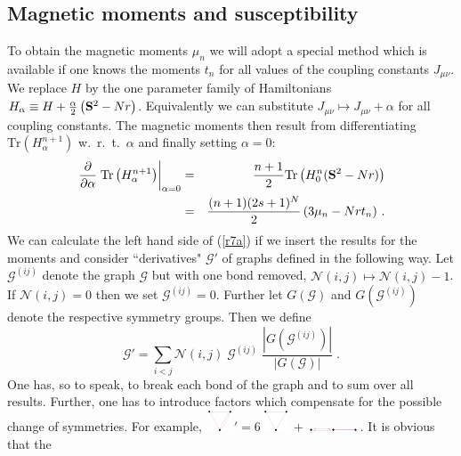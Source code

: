 \documentclass[aps,twocolumn,groupedaddress]{revtex4}
\begin{document}
\subsection{Magnetic moments and susceptibility}\label{sec:R_susc}
To obtain the magnetic moments $\mu_n$ we will adopt a special
method which is available if one knows the moments $t_n$ for all
values of the coupling constants $J_{\mu\nu}$. We replace $H$ by the
one parameter family of Hamiltonians $H_\alpha\equiv
H+\frac{\alpha}{2}\left({\bf S}^2-N r \right)$. Equivalently we can
substitute $J_{\mu\nu}\mapsto J_{\mu\nu}+\alpha$ for all coupling
constants. The magnetic moments then result from differentiating
$\mbox{Tr}(H_\alpha^{n+1})$ w.~r.~t.~$\alpha$ and finally setting
$\alpha=0$:
\begin{eqnarray}\label{r7a}
\left.\frac{\partial}{\partial\alpha}\;\mbox{Tr}\left(H_\alpha^{n+1}\right)\right|_{\alpha=0}&=&
\frac{n+1}{2}\mbox{Tr}\left(H_0^n({\bf S}^2-N r)\right)\\
&=&\frac{(n+1)(2s+1)^N}{2}\left( 3\mu_n - N r t_n\right)\,.\nonumber
\label{r7b}
\end{eqnarray}
We can calculate the left hand side of (\ref{r7a}) if we insert the
results for the moments and consider ``derivatives" ${\mathcal G}'$
of graphs defined in the following way. Let ${\mathcal G}^{(ij)}$
denote the graph ${\mathcal G}$ but with one bond removed,
${\mathcal N}(i,j)\mapsto {\mathcal N}(i,j)-1$. If ${\mathcal
N}(i,j)=0$ then we set ${\mathcal G}^{(ij)}=0$. Further let
$G({\mathcal G})$ and $G({\mathcal G}^{(ij)})$ denote the respective
symmetry groups. Then we define
\begin{equation}\label{r8}
{\mathcal G}' = \sum_{i<j}{\mathcal N}(i,j)\;{\mathcal G}^{(ij)}
\;\frac{|G({\mathcal G}^{(ij)})|}{|G({\mathcal G})|} \;.
\end{equation}
One has, so to speak, to break each bond of the graph and to sum
over all results. Further, one has to introduce factors which
compensate for the possible change of symmetries. For example,
$\,${\includegraphics[width=7mm]{G16}}$ \,'= 6\;
${\includegraphics[width=7mm]{G8}}$\;
+\;${\includegraphics[width=14mm]{G6}}$\;$. It is obvious that the
\end{document}
